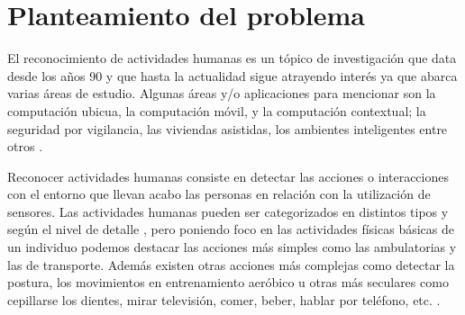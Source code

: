 \section{Planteamiento del problema}

\label{sec11:planteamiento}

El reconocimiento de actividades humanas es un tópico de investigación
que data desde los años 90 y que hasta la actualidad sigue atrayendo
interés ya que abarca varias áreas de estudio. Algunas áreas y/o aplicaciones
para mencionar son la computación ubicua, la computación móvil, y
la computación contextual; la seguridad por vigilancia, las viviendas
asistidas, los ambientes inteligentes entre otros \cite{Chen2012}. 

Reconocer actividades humanas consiste en detectar las acciones o
interacciones con el entorno que llevan acabo las personas en relación
con la utilización de sensores. Las actividades humanas pueden ser
categorizados en distintos tipos y según el nivel de detalle \cite{Chen2012},
pero poniendo foco en las actividades físicas básicas de un individuo
podemos destacar las acciones más simples como las ambulatorias y
las de transporte. Además existen otras acciones más complejas como
detectar la postura, los movimientos en entrenamiento aeróbico u otras
más seculares como cepillarse los dientes, mirar televisión, comer,
beber, hablar por teléfono, etc. \cite{LaraLabrador2013}.

